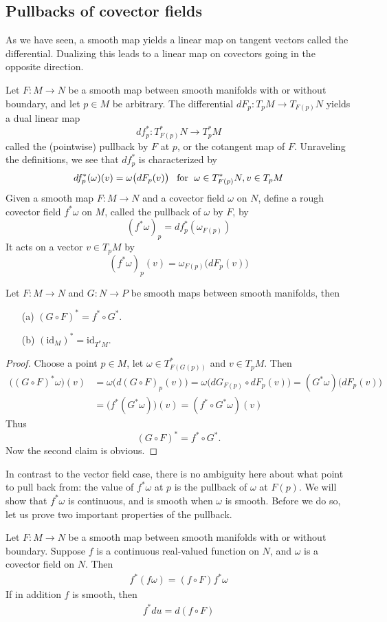 \subsection{Pullbacks of covector fields}
As we have seen, a smooth map yields a linear map on tangent vectors called the differential. Dualizing this leads to a linear map on covectors going in the opposite
direction.\par
Let $F:M\to N$ be a smooth map between smooth manifolds with or without boundary, and let $p\in M$ be arbitrary. The differential $dF_p:T_pM\to T_{F(p)}N$ yields a dual linear map
\[df^*_p:T^*_{F(p)}N\to T^*_pM\]
called the (pointwise) pullback by $F$ at $p$, or the cotangent map of $F$. Unraveling the definitions, we see that $df^*_p$ is characterized by
\[df^*_p(\omega)(v)=\omega\big(dF_p(v)\big)\hspace{8pt}\text{for}\hspace{6pt} \omega\in T^*_{F(p)}N,v\in T_pM\]
Given a smooth map $F:M\to N$ and a covector field $\omega$ on $N$, define a rough covector field $f^*\omega$ on $M$, called the pullback of $\omega$ by $F$, by
\[(f^*\omega)_p=df^*_p(\omega_{F(p)})\]
It acts on a vector $v\in T_pM$ by
\[(f^*\omega)_p(v)=\omega_{F(p)}\big(dF_p(v)\big)\]
\begin{proposition}\label{pull back functor}
Let $F:M\to N$ and $G:N\to P$ be smooth maps between smooth manifolds, then
\begin{itemize}
\item[(a)] $(G\circ F)^*=f^*\circ G^*$.
\item[(b)] $(\mathrm{id}_M)^*=\mathrm{id}_{T^*M}$.
\end{itemize}
\end{proposition}
\begin{proof}
Choose a point $p\in M$, let $\omega\in T^*_{F(G(p))}$ and $v\in T_pM$. Then 
\begin{align*}
\big((G\circ F)^*\omega\big)(v)&=\omega\big(d(G\circ F)_p(v)\big)=\omega\big(dG_{F(p)}\circ dF_{p}(v)\big)=(G^*\omega)\big(dF_p(v)\big)\\
&=\big(f^*(G^*\omega)\big)(v)=(f^*\circ G^*\omega)(v)
\end{align*}
Thus
\[(G\circ F)^*=f^*\circ G^*.\]
Now the second claim is obvious.
\end{proof}
In contrast to the vector field case, there is no ambiguity here about what point to pull back from: the value of $f^*\omega$ at $p$ is the pullback of $\omega$ at $F(p)$. We will show that $f^*\omega$ is continuous, and is smooth when $\omega$ is smooth. Before we do so, let us prove two important properties of the pullback.
\begin{proposition}\label{pull back prop}
Let $F:M\to N$ be a smooth map between smooth manifolds with or without boundary. Suppose $f$ is a continuous real-valued function on $N$, and $\omega$ is a covector field on $N$. Then
\begin{align}\label{pull back prop-1}
f^*(f\omega)=(f\circ F)f^*\omega
\end{align}
If in addition $f$ is smooth, then
\begin{align}\label{pull back prop-2}
f^*du=d(f\circ F)
\end{align}
\end{proposition}
